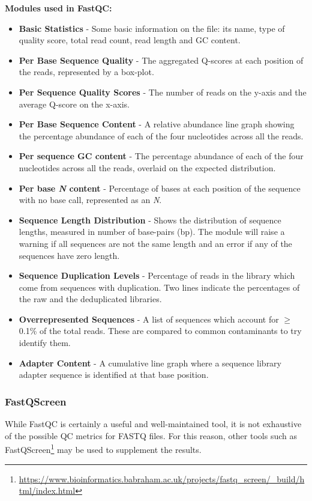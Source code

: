 \textbf{Modules used in FastQC:}
\begin{itemize} \itemsep0em
\item \textbf{Basic Statistics} - Some basic information on the file: its name, type of quality score, total read count, read length and GC content.
\item \textbf{Per Base Sequence Quality} - The aggregated Q-scores at each position of the reads, represented by a box-plot.
\item \textbf{Per Sequence Quality Scores} - The number of reads on the y-axis and the average Q-score on the x-axis.
\item \textbf{Per Base Sequence Content} - A relative abundance line graph showing the percentage abundance of each of the four nucleotides across all the reads. 
\item \textbf{Per sequence GC content} - The percentage abundance of each of the four nucleotides across all the reads, overlaid on the expected distribution. 
\item \textbf{Per base \textit{N} content} - Percentage of bases at each position of the sequence with no base call, represented as an \textit{N}.
\item \textbf{Sequence Length Distribution} - Shows the distribution of sequence lengths, measured in number of base-pairs (bp). The module will raise a warning if all sequences are not the same length and an error if any of the sequences have zero length.
\item \textbf{Sequence Duplication Levels} - Percentage of reads in the library which come from sequences with duplication. Two lines indicate the percentages of the raw and the deduplicated libraries.
\item \textbf{Overrepresented Sequences} - A list of sequences which account for $\geq$0.1\% of the total reads. These are compared to common contaminants to try identify them.
\item \textbf{Adapter Content} - A cumulative line graph where a sequence library adapter sequence is identified at that base position.
\end{itemize}

\subsubsection{FastQScreen}
While FastQC is certainly a useful and well-maintained tool, it is not exhaustive of the possible QC metrics for FASTQ files. For this reason, other tools such as FastQScreen\footnote{\url{https://www.bioinformatics.babraham.ac.uk/projects/fastq_screen/_build/html/index.html}} \citep{wingett2018fastq} may be used to supplement the results.

